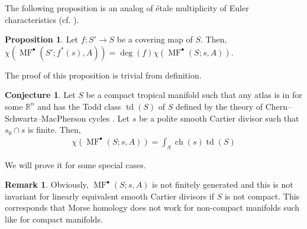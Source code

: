 \documentclass[a4paper,dvipdfmx,reqno,12pt]{amsart}
\theoremstyle{definition}
\newtheorem{Prop}[Thm]{Proposition}
\newtheorem{Conj}[Thm]{Conjecture}
\newtheorem{Rmk}[Thm]{Remark}
\newcommand{\R}{\mathbb{R}}%
\newcommand{\opn}[1]{\operatorname{#1}}
\numberwithin{equation}{section}
\begin{document}
The following proposition is an analog of \'{e}tale multiplicity of Euler characteristics
(cf. \cite[Proposition 1.1.28]{MR2095471}).

\begin{Prop}
Let $f:S' \to S$ be a covering map of $S$.
Then, $\chi(\opn{MF}^{\bullet}(S';f^{*}(s),A))=
\opn{deg}(f)\chi(\opn{MF}^{\bullet}(S;s,A))$.
\end{Prop}

The proof of this proposition is trivial from definition.

\begin{Conj} \label{conj: conj}
Let $S$ be a compact tropical manifold such that any atlas is in for some 
$\R^{n}$ and has the Todd class $\opn{td}(S)$ of $S$ 
defined by the theory of Chern--Schwartz--MacPherson
cycles
\cite[Previous work]{lopezdemedranoChernSchwartzMacPhersonCyclesMatroids2020}.
Let $s$ be a polite smooth Cartier divisor such that
$s_0\cap s$ is finite. Then, 
\begin{align}
\chi(\opn{MF}^{\bullet}(S;s,A))=\int_{S}\opn{ch}(s)\opn{td}(S)
\end{align}
\end{Conj}
We will prove it for some special cases.

\begin{Rmk}
Obviously, $\opn{MF}^{\bullet}(S;s,A)$ is not finitely
generated and this is not invariant for linearly 
equivalent smooth Cartier divisors
if $S$ is not compact.
This corresponds that Morse homology does not work
for non-compact manifolds such like for compact manifolds.
\end{Rmk}
\end{document}
